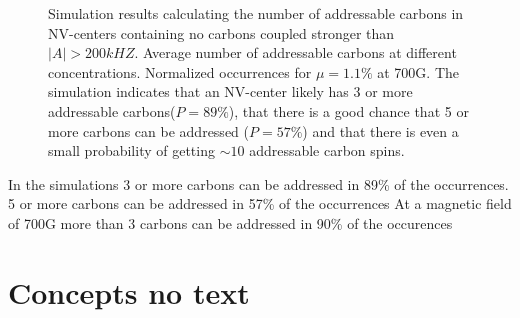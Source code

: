 \begin{figure}[htbp]
    \begin{subfigure}[t]{0.49\textwidth}\centering
        \caption{}
        \label{fig:Simulations_avg_n_vs_bfield}
    \end{subfigure}
    \begin{subfigure}[t]{0.49\textwidth}\centering
    \caption{}
    \label{fig:simulations_histogram_vs_Bfield}
    \end{subfigure}
    \caption{Simulation results calculating the number of addressable carbons in NV-centers containing no carbons coupled stronger than $|A|>200kHZ$.  Average number of addressable carbons at different concentrations.  Normalized occurrences for $\mu = 1.1\%$ at 700G. The simulation indicates that an NV-center likely has 3 or more addressable carbons($P=89\%$), that there is a good chance that 5 or more carbons can be addressed ($P=57\%$) and that there is even a small probability of getting $\sim 10$ addressable carbon spins. }
    \label{fig:Simulation_results}
\end{figure}

In the simulations 3 or more carbons can be addressed in 89\% of the occurrences.
5 or more carbons can be addressed in 57\% of the occurrences
At a magnetic field of 700G more than 3 carbons can be addressed in 90\% of the occurences

\section{Concepts no text }






